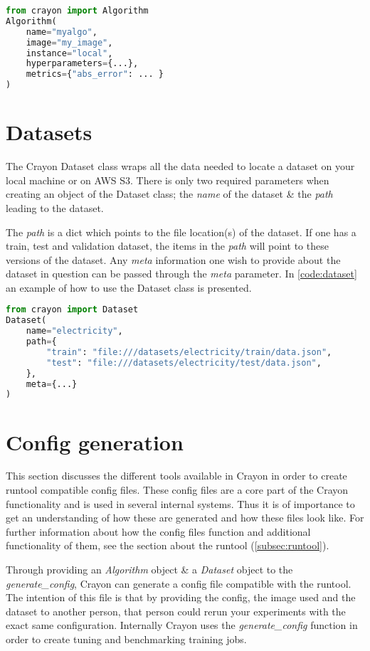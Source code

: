 \begin{lstlisting}[language=Python, label={code:algorithm}, caption=Example of the Algorithm class.]
from crayon import Algorithm
Algorithm(
    name="myalgo", 
    image="my_image", 
    instance="local",
    hyperparameters={...},
    metrics={"abs_error": ... }
)
\end{lstlisting}

\section{Datasets}
\label{crayon:datasets}
The Crayon Dataset class wraps all the data needed to locate a dataset on your local machine or on AWS S3. There is only two required parameters when creating an object of the Dataset class; the \textit{name} of the dataset \& the \textit{path} leading to the dataset. 

The \textit{path} is a dict which points to the file location(s) of the dataset. If one has a train, test and validation dataset, the items in the \textit{path} will point to these versions of the dataset. Any \textit{meta} information one wish to provide about the dataset in question can be passed through the \textit{meta} parameter. In \ref{code:dataset} an example of how to use the Dataset class is presented. 
\begin{lstlisting}[language=Python, label={code:dataset}, caption=Example of the Dataset class.]
from crayon import Dataset
Dataset(
    name="electricity",
    path={
        "train": "file:///datasets/electricity/train/data.json",
        "test": "file:///datasets/electricity/test/data.json",
    },
    meta={...}
)
\end{lstlisting}

\section{Config generation}
\label{'subsub:config_generation'}
This section discusses the different tools available in Crayon in order to create runtool compatible config files. These config files are a core part of the Crayon functionality and is used in several internal systems. Thus it is of importance to get an understanding of how these are generated and how these files look like. For further information about how the config files function and additional functionality of them, see the section about the runtool (\ref{subsec:runtool}).  

Through providing an \textit{Algorithm} object \& a \textit{Dataset} object to the \textit{generate\_config}, Crayon can generate a config file compatible with the runtool.  The intention of this file is that by providing the config, the image used and the dataset to another person, that person could rerun your experiments with the exact same configuration. Internally Crayon uses the \textit{generate\_config} function in order to create tuning and benchmarking training jobs.

